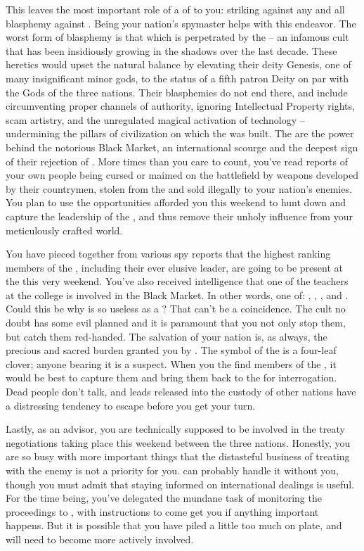\documentclass[char]{GL2020}
\begin{document}
This leaves the most important role of a \cAntiChup{\cleric} of \cTechGod{} to you: striking against any and all blasphemy against \cTechGod{}. Being your nation's spymaster helps with this endeavor. The worst form of blasphemy is that which is perpetrated by the \pGoaties{} -- an infamous cult that has been insidiously growing in the shadows over the last decade. These heretics would upset the natural balance by elevating their deity Genesis, one of many insignificant minor gods, to the status of a fifth patron Deity on par with the Gods of the three nations. Their blasphemies do not end there, and include circumventing proper channels of authority, ignoring Intellectual Property rights, scam artistry, and the unregulated magical activation of technology -- undermining the pillars of civilization on which the \pTech{} was built. The \pGoaties{} are the power behind the notorious Black Market, an international scourge and the deepest sign of their rejection of \cTechGod{}. More times than you care to count, you've read reports of your own people being cursed or maimed on the battlefield by weapons developed by their countrymen, stolen from the \pTech{} and sold illegally to your nation's enemies. You plan to use the opportunities afforded you this weekend to hunt down and capture the leadership of the \pGoaties{}, and thus remove their unholy influence from your meticulously crafted world. 

You have pieced together from various spy reports that the highest ranking members of the \pGoaties{}, including their ever elusive leader, are going to be present at the \pSchool{} this very weekend. You've also received intelligence that one of the \pTech{} teachers at the college is involved in the Black Market. In other words, one of: \cEthics{\full}, \cBeetle{\full}, \cLibrarian{\full}, and \cChupInventor{\full}. Could this be why \cBeetle{} is so useless as a \cBeetle{\cleric}? That can't be a coincidence. The cult no doubt has some evil planned and it is paramount that you not only stop them, but catch them red-handed. The salvation of your nation is, as always, the precious and sacred burden granted you by \cTechGod{}. The symbol of the \pGoaties{} is a four-leaf clover; anyone bearing it is a suspect. When you the find members of the \pGoaties{}, it would be best to capture them and bring them back to the \pTech{} for interrogation. Dead people don't talk, and leads released into the custody of other nations have a distressing tendency to escape before you get your turn.

Lastly, as an advisor, you are technically supposed to be involved in the treaty negotiations taking place this weekend between the three nations. Honestly, you are so busy with more important things that the distasteful business of treating with the enemy is not a priority for you. \cDiplomat{} can probably handle it without you, though you must admit that staying informed on international dealings is useful. For the time being, you've delegated the mundane task of monitoring the proceedings to \cScholarship{}, with instructions to come get you if anything important happens. But it is possible that you have piled a little too much on  plate, and will need to become more actively involved.
\end{document}
